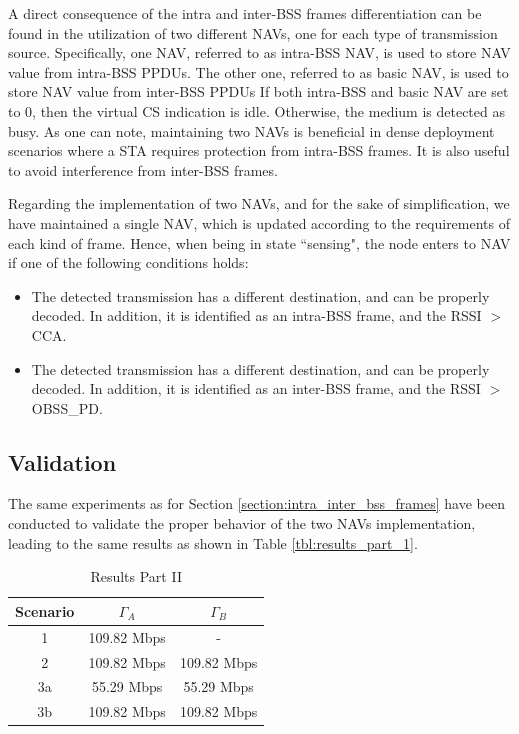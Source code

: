 \documentclass[]{article}
\begin{document}
	A direct consequence of the intra and inter-BSS frames differentiation can be found in the utilization of two different NAVs, one for each type of transmission source. Specifically, one NAV, referred to as intra-BSS NAV, is used to store NAV value from intra-BSS PPDUs. The other one, referred to as basic NAV, is used to store NAV value from inter-BSS PPDUs
	If both intra-BSS and basic NAV are set to 0, then the virtual CS indication is idle. Otherwise, the medium is detected as busy. As one can note, maintaining two NAVs is beneficial in dense deployment scenarios where a STA requires protection from intra-BSS frames. It is also useful to avoid interference from inter-BSS frames.	
	
	Regarding the implementation of two NAVs, and for the sake of simplification, we have maintained a single NAV, which is updated according to the requirements of each kind of frame. Hence, when being in state ``sensing", the node enters to NAV if one of the following conditions holds:
	\begin{itemize}
		\item The detected transmission has a different destination, and can be properly decoded. In addition, it is identified as an intra-BSS frame, and the RSSI $>$ CCA.
		\item The detected transmission has a different destination, and can be properly decoded. In addition, it is identified as an inter-BSS frame, and the RSSI $>$ OBSS\_PD.
	\end{itemize}
	
	\subsection{Validation}
	
	The same experiments as for Section \ref{section:intra_inter_bss_frames} have been conducted to validate the proper behavior of the two NAVs implementation, leading to the same results as shown in Table \ref{tbl:results_part_1}.
	
	\begin{table}[]
		\centering
		\begin{tabular}{|c|c|c|}
			\hline
			\textbf{Scenario} & \textbf{$\Gamma_A$} & \textbf{$\Gamma_B$} \\ \hline
			1 & 109.82 Mbps & - \\ \hline
			2 & 109.82 Mbps & 109.82 Mbps \\ \hline
			3a & 55.29 Mbps & 55.29 Mbps \\ \hline
			3b & 109.82 Mbps & 109.82 Mbps \\ \hline
		\end{tabular}
		\caption{Results Part II}
		\label{tbl:results_part_2}
	\end{table}
\end{document}
